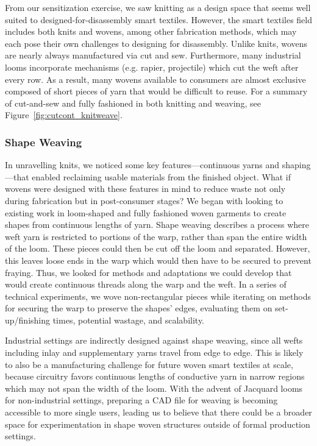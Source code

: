 \documentclass{sigchi}
\newcommand\laura[1]{#1}
\renewcommand\todo[1]{\emph{\color{red}[#1]}}
\begin{document}
From our sensitization exercise, we saw knitting as a design space that seems well suited to designed-for-disassembly smart textiles. However, the smart textiles field includes both knits and wovens, among other fabrication methods, which may each pose their own challenges to designing for disassembly. 
Unlike knits, wovens are nearly always manufactured via cut and sew. Furthermore, many industrial looms incorporate mechanisms (e.g. rapier, projectile) which cut the weft after every row. As a result, many wovens available to consumers are almost exclusive composed of short pieces of yarn that would be difficult to reuse. For a summary of cut-and-sew and fully fashioned in both knitting and weaving, see Figure~\ref{fig:cutcont_knitweave}.

\subsubsection{Shape Weaving}
In unravelling knits, we noticed some key features---continuous yarns and shaping---that enabled reclaiming usable materials from the finished object. What if wovens were designed with these features in mind to reduce waste not only during fabrication but in post-consumer stages? We began with looking to existing work in loom-shaped and fully fashioned woven garments to create shapes from continuous lengths of yarn.
\laura{Shape weaving describes a process where weft yarn is restricted to portions of the warp, rather than span the entire width of the loom.} These pieces could then be cut off the loom and separated. However, this leaves loose ends in the warp which would then have to be secured to prevent fraying. \laura{Thus, we looked for methods and adaptations we could develop that would create continuous threads along the warp and the weft.} In a series of technical experiments, we wove non-rectangular pieces while iterating on methods for securing the warp to preserve the shapes' edges, evaluating them on set-up/finishing times, potential wastage, and scalability. 

Industrial settings are indirectly designed against shape weaving, since all wefts including inlay and supplementary yarns travel from edge to edge. %
This is likely to also be a manufacturing challenge for future woven smart textiles at scale, because circuitry favors continuous lengths of conductive yarn in narrow regions which may not span the width of the loom. With the advent of Jacquard looms for non-industrial settings, preparing a CAD file for weaving is becoming accessible to more single users, leading us to believe that there could be a broader space for experimentation in shape woven structures outside of formal production settings. 
\end{document}
